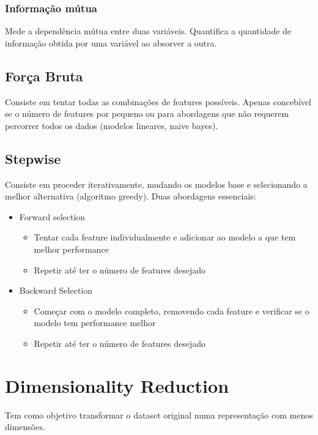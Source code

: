 \documentclass[10pt,a4paper]{report}
\begin{document}
\subsubsection{Informação mútua}
Mede a dependência mútua entre duas variáveis. Quantifica a quantidade de informação obtida por uma variável ao absorver a outra.
\subsection{Força Bruta}
Consiste em tentar todas as combinações de features possíveis. Apenas concebível se o número de features por pequeno ou para abordagens que não requerem percorrer todos os dados (modelos lineares, naive bayes).
\subsection{Stepwise}
Consiste em proceder iterativamente, mudando os modelos base e selecionando a melhor alternativa (algoritmo greedy). Duas abordagens essenciais:
\begin{itemize}
\item Forward selection
\begin{itemize}
\item Tentar cada feature individualmente e adicionar ao modelo a que tem melhor performance
\item Repetir até ter o número de features desejado
\end{itemize}
\item Backward Selection
\begin{itemize}
\item Começar com o modelo completo, removendo cada feature e verificar se o modelo tem performance melhor
\item Repetir até ter o número de features desejado
\end{itemize}
\end{itemize}
\section{Dimensionality Reduction}
Tem como objetivo transformar o dataset original numa representação com menos dimensões.
\end{document}
